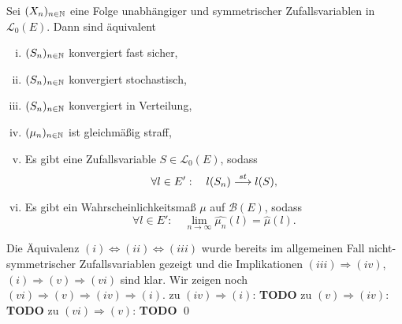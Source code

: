\begin{theorem}
    Sei $(X_n)_{n \in \mathbb{N}}$ eine Folge unabhängiger und symmetrischer Zufallsvariablen in $\mathcal{L}_0(E)$. Dann sind äquivalent
    \begin{enumerate}[(i)]
        \item $(S_n)_{n \in \mathbb{N}}$ konvergiert fast sicher, 
        \item $(S_n)_{n \in \mathbb{N}}$ konvergiert stochastisch, 
        \item $(S_n)_{n \in \mathbb{N}}$ konvergiert in Verteilung, 
        \item $(\mu_n)_{n \in \mathbb{N}}$ ist gleichmäßig straff, 
        \item Es gibt eine Zufallsvariable $S \in \mathcal{L}_0(E)$, sodass 
        $$
            \forall l \in E': \quad l(S_n) \overset{st}{\longrightarrow} l(S),
        $$
        \item Es gibt ein Wahrscheinlichkeitsmaß $\mu$ auf $\mathcal{B}(E)$, sodass 
        $$
            \forall l \in E': \quad \lim_{n \to \infty}\widehat{\mu_n}(l) = \widehat{\mu}(l). 
        $$
    \end{enumerate}
\end{theorem}

\begin{proof*}
    Die Äquivalenz $(i) \iff (ii) \iff (iii)$ wurde bereits im allgemeinen Fall nicht-symmetrischer Zufallsvariablen gezeigt und die Implikationen $(iii) \Rightarrow (iv)$, $(i) \Rightarrow (v) \Rightarrow (vi)$ sind klar. 
    Wir zeigen noch $(vi) \Rightarrow (v) \Rightarrow (iv) \Rightarrow (i)$. 
    \newline
    zu $(iv) \Rightarrow (i)$:
    \textbf{TODO}
    \newline 
    zu $(v) \Rightarrow (iv)$:
    \textbf{TODO}
    \newline
    zu $(vi) \Rightarrow (v)$: 
    \textbf{TODO}
    \qed
\end{proof*}